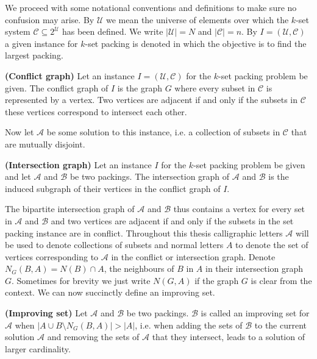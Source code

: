 We proceed with some notational conventions and definitions to make sure no confusion may arise.
By $\mathcal{U}$ we mean the universe of elements over which the $k$-set system $\mathcal{C} \subseteq 2^{\mathcal{U}}$ has been defined. We write $|\mathcal{U}| = N$ and $|\mathcal{C}| = n$. By $I = (\mathcal{U},\mathcal{C})$ a given instance for $k$-set packing is denoted in which the objective is to find the largest packing. %
%
\begin{defn}
\textbf{(Conflict graph)} Let an instance $I = (\mathcal{U},\mathcal{C})$ for the $k$-set packing problem be given. The conflict graph of $I$ is the graph $G$ where every subset in $\mathcal{C}$ is represented by a vertex. Two vertices %
are adjacent if and only if %
the subsets in $\mathcal{C}$ these vertices correspond to intersect each other.
\end{defn}
%
Now let $\mathcal{A}$ be some solution to this instance, i.e. a collection of subsets in $\mathcal{C}$ that are mutually disjoint.
%
\begin{defn}
\textbf{(Intersection graph)} Let an instance $I$ for the $k$-set packing problem be given and let $\mathcal{A}$ and $\mathcal{B}$ be two packings. The intersection graph of $\mathcal{A}$ and $\mathcal{B}$ is the induced subgraph of their vertices in the conflict graph of $I$.
\end{defn}
%
The bipartite intersection graph of $\mathcal{A}$ and $\mathcal{B}$ thus contains a vertex for every set in $\mathcal{A}$ and $\mathcal{B}$ and two vertices %
are adjacent %
if and only if %
the subsets in the set packing instance are in conflict. Throughout this thesis calligraphic letters $\mathcal{A}$ will be used to denote collections of subsets and normal letters $A$ to denote the set of vertices corresponding to $\mathcal{A}$ in the conflict or intersection graph. Denote $N_G(B,A) = N(B) \cap A$, the neighbours of $B$ in $A$ in their intersection graph $G$. Sometimes for brevity we just write $N(G,A)$ if the graph $G$ is clear from the context. We can now succinctly define an improving set.
%
\begin{defn}
\textbf{(Improving set)} Let $\mathcal{A}$ and $\mathcal{B}$ be two packings. $\mathcal{B}$ is called an improving set for $\mathcal{A}$ when $\left| A \cup B \setminus N_G(B,A) \right| > |A|$, i.e. when adding the sets of $\mathcal{B}$ to the current solution $\mathcal{A}$ and removing the sets of $\mathcal{A}$ that they intersect, leads to a solution of larger cardinality.
\end{defn}
